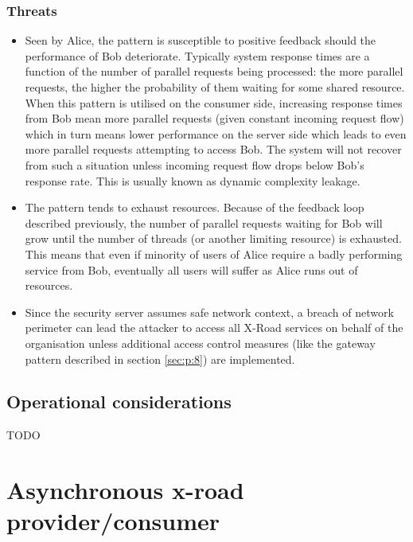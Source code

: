\documentclass[10pt,a4paper]{article}
\begin{document}
\subsubsection{Threats}
	\begin{itemize}
		\item Seen by Alice, the pattern is susceptible to positive feedback should the performance of Bob deteriorate. Typically system response times are a function of the number of parallel requests being processed: the more parallel requests, the higher the probability of them waiting for some shared resource. When this pattern is utilised on the consumer side, increasing response times from Bob mean more parallel requests (given constant incoming request flow) which in turn means lower performance on the server side which leads to even more parallel requests attempting to access Bob. The system will not recover from such a situation unless incoming request flow drops below Bob's response rate. This is usually known as dynamic complexity leakage.
		\item The pattern tends to exhaust resources. Because of the feedback loop described previously, the number of parallel requests waiting for Bob will grow until the number of threads (or another limiting resource) is exhausted. This means that even if minority of users of Alice require a badly performing service from Bob, eventually all users will suffer as Alice runs out of resources. 
		\item Since the security server assumes safe network context, a breach of network perimeter can lead the attacker to access all X-Road services on behalf of the organisation unless additional access control measures (like the gateway pattern described in section \ref{sec:p:8}) are implemented.
	\end{itemize} 


\subsection{Operational considerations}
TODO

\section{Asynchronous x-road provider/consumer}
\label{sec:p:5}
\end{document}
